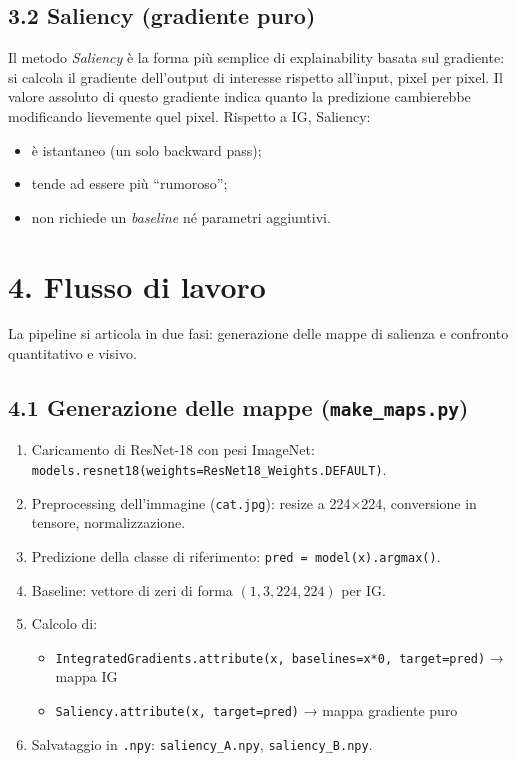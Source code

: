 \documentclass[a4paper,11pt]{article}
\begin{document}
\subsection*{3.2 Saliency (gradiente puro)}
Il metodo \emph{Saliency} è la forma più semplice di explainability basata sul gradiente: 
si calcola il gradiente dell’output di interesse rispetto all’input, pixel per pixel.  
Il valore assoluto di questo gradiente indica quanto la predizione cambierebbe modificando lievemente quel pixel.  
Rispetto a IG, Saliency:
\begin{itemize}
  \item è istantaneo (un solo backward pass);
  \item tende ad essere più “rumoroso”;
  \item non richiede un \emph{baseline} né parametri aggiuntivi.
\end{itemize}

\section*{4. Flusso di lavoro}
La pipeline si articola in due fasi: generazione delle mappe di salienza e confronto quantitativo e visivo.

\subsection*{4.1 Generazione delle mappe (\texttt{make\_maps.py})}
\begin{enumerate}
  \item Caricamento di ResNet-18 con pesi ImageNet: 
    \texttt{models.resnet18(weights=ResNet18\_Weights.DEFAULT)}.
  \item Preprocessing dell’immagine (\texttt{cat.jpg}): resize a 224×224, conversione in tensore, normalizzazione.
  \item Predizione della classe di riferimento: 
    \texttt{pred = model(x).argmax()}.
  \item Baseline: vettore di zeri di forma $(1,3,224,224)$ per IG.
  \item Calcolo di:
    \begin{itemize}
      \item \texttt{IntegratedGradients.attribute(x, baselines=x*0, target=pred)} → mappa IG
      \item \texttt{Saliency.attribute(x, target=pred)} → mappa gradiente puro
    \end{itemize}
  \item Salvataggio in \texttt{.npy}: \texttt{saliency\_A.npy}, \texttt{saliency\_B.npy}.
\end{enumerate}
\end{document}

